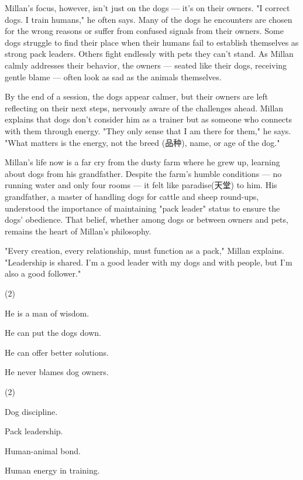 \documentclass{英语试卷}
\begin{document}
\par Millan's focus, however, isn't just on the dogs — it's on their owners. "I correct dogs. I train humans," he often says. Many of the dogs he encounters are chosen for the wrong reasons or suffer from confused signals from their owners. Some dogs struggle to find their place when their humans fail to establish themselves as strong pack leaders. Others fight endlessly with pets they can't stand. As Millan calmly addresses their behavior, the owners — seated like their dogs, receiving gentle blame — often look as sad as the animals themselves.\par
\par By the end of a session, the dogs appear calmer, but their owners are left reflecting on their next steps, nervously aware of the challenges ahead. Millan explains that dogs don't consider him as a trainer but as someone who connects with them through energy. "They only sense that I am there for them," he says. "What matters is the energy, not the breed (品种), name, or age of the dog."\par
\par Millan's life now is a far cry from the dusty farm where he grew up, learning about dogs from his grandfather. Despite the farm's humble conditions — no running water and only four rooms — it felt like paradise(天堂) to him. His grandfather, a master of handling dogs for cattle and sheep round-ups, understood the importance of maintaining "pack leader" status to ensure the dogs’ obedience. That belief, whether among dogs or between owners and pets, remains the heart of Millan's philosophy.\par
\par "Every creation, every relationship, must function as a pack," Millan explains. "Leadership is shared. I'm a good leader with my dogs and with people, but I'm also a good follower."\par
{}
\begin{choices}(2)
  \item He is a man of wisdom.
  \item He can put the dogs down.
  \item He can offer better solutions.
  \item He never blames dog owners.
\end{choices}
\begin{choices}(2)
  \item Dog discipline.
  \item Pack leadership.
  \item Human-animal bond.
  \item Human energy in training.
\end{choices}
\end{document}
